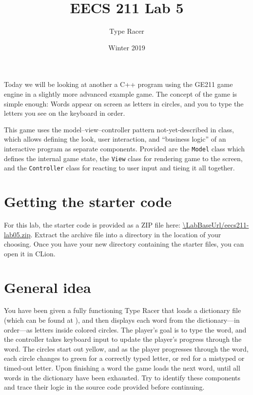 \documentclass{tufte-handout}
\title{EECS 211 Lab 5}
\author{Type Racer}
\date{Winter 2019}
\def\ThisLabBase{eecs211-lab05}
\def\ThisLabUrl{\LabBaseUrl/\ThisLabBase.zip}
\begin{document}
\maketitle

Today we will be looking at another a C++ program using the GE211 game
engine in a slightly more advanced example game. The concept of the game
is simple enough: Words appear on screen as letters in circles, and you
to type the letters you see on the keyboard in order.

This game uses the model--view--controller pattern not-yet-described in
class, which allows defining the look, user interaction, and ``business
logic'' of an interactive program as separate components. Provided are
the \texttt{Model} class which defines the internal game state, the
\texttt{View} class for rendering game to the screen, and the
\texttt{Controller} class for reacting to user input and tieing it all
together.

\section{Getting the starter code}

For this lab, the starter code is provided as a ZIP file here:
\url{\ThisLabUrl}. Extract the archive file into a directory in the
location of your choosing. Once you have your new directory containing
the starter files, you can open it in CLion.


\section{General idea}

You have been given a fully functioning Type Racer that loads a
dictionary file (which can be found at
), and then displays each word from
the dictionary---in order---as letters inside colored circles. The
player's goal is to type the word, and the controller takes keyboard
input to update the player's progress through the word. The circles
start out yellow, and as the player progresses through the word, each
circle changes to green for a correctly typed letter, or red for a
mistyped or timed-out letter. Upon finishing a word the game loads the
next word, until all words in the dictionary have been exhausted. Try to
identify these components and trace their logic in the source code
provided before continuing.
\end{document}
